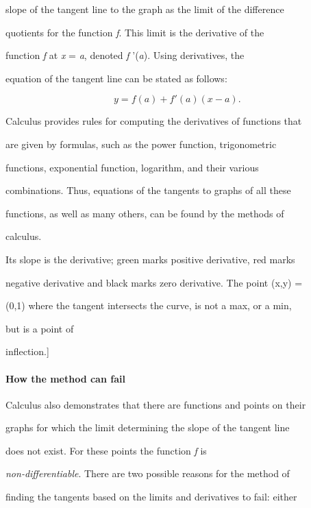 slope of the tangent line to the graph as the limit of the difference

quotients for the function \textit{f}. This limit is the derivative of the

function \textit{f} at \textit{x} = \textit{a}, denoted \textit{f} '(\textit{a}). Using derivatives, the

equation of the tangent line can be stated as follows:



$$y=f(a)+f'(a)(x-a).\,$$



Calculus provides rules for computing the derivatives of functions that

are given by formulas, such as the power function, trigonometric

functions, exponential function, logarithm, and their various

combinations. Thus, equations of the tangents to graphs of all these

functions, as well as many others, can be found by the methods of

calculus.




Its slope is the derivative; green marks positive derivative, red marks

negative derivative and black marks zero derivative. The point (x,y) =

(0,1) where the tangent intersects the curve, is not a max, or a min,

but is a point of

inflection.]



\paragraph{How the method can fail}



Calculus also demonstrates that there are functions and points on their

graphs for which the limit determining the slope of the tangent line

does not exist. For these points the function \textit{f} is

\textit{non-differentiable}. There are two possible reasons for the method of

finding the tangents based on the limits and derivatives to fail: either

